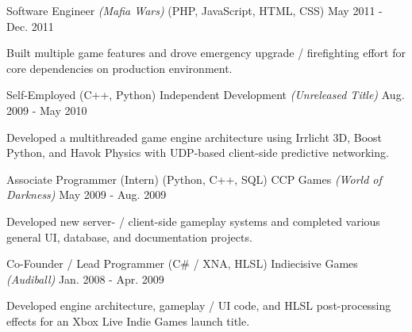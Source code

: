 \begin{cventries}

  \cventry
    {{\color{awesome}Software Engineer} \textit{(Mafia Wars)} (PHP, JavaScript, HTML, CSS)} %
    {} %
    {} %
    {May 2011 - Dec. 2011} %
    { %
      \begin{cvitems}
        \item {Built multiple game features and drove emergency upgrade / firefighting effort for core dependencies on production environment.}
      \end{cvitems}
    }


  \cventry
    {{\color{awesome}Self-Employed} (C++, Python)} %
    {Independent Development \textit{(Unreleased Title)}} %
    {} %
    {Aug. 2009 - May 2010} %
    { %
      \begin{cvitems}
        \item {Developed a multithreaded game engine architecture using Irrlicht 3D, Boost Python, and Havok Physics with UDP-based client-side predictive networking.}
      \end{cvitems} 
    }


  \cventry
    {{\color{awesome}Associate Programmer (Intern)} (Python, C++, SQL)} %
    {CCP Games \textit{(World of Darkness)}} %
    {} %
    {May 2009 - Aug. 2009} %
    { %
      \begin{cvitems}
        \item {Developed new server- / client-side gameplay systems and completed various general UI, database, and documentation projects.}
      \end{cvitems}
    }


  \cventry
    {{\color{awesome}Co-Founder / Lead Programmer} (C\# / XNA, HLSL)} %
    {Indiecisive Games \textit{(Audiball)}} %
    {} %
    {Jan. 2008 - Apr. 2009} %
    { %
      \begin{cvitems}
        \item {Developed engine architecture, gameplay / UI code, and HLSL post-processing effects for an Xbox Live Indie Games launch title.}
      \end{cvitems}
    }


\end{cventries}
